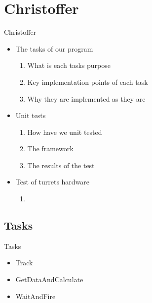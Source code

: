 \section{Christoffer}
\begin{frame}{Christoffer}
\begin{itemize}
\end{itemize}
\end{frame}

\begin{frame}{}
\begin{itemize}
  \item The tasks of our program
  		\begin{enumerate}
  			\item What is each tasks purpose
  			\item Key implementation points of each task
  			\item Why they are implemented as they are  
		\end{enumerate}
  \item Unit tests
  		\begin{enumerate}
  			\item How have we unit tested
  			\item The framework
  			\item The results of the test
		\end{enumerate}
  \item Test of turrets hardware
  		\begin{enumerate}
  			\item 
		\end{enumerate}
\end{itemize}
\end{frame}

\subsection{Tasks}
\begin{frame}{Tasks}
\begin{itemize}
  \item Track
  \item GetDataAndCalculate
  \item WaitAndFire
\end{itemize}
\end{frame}

